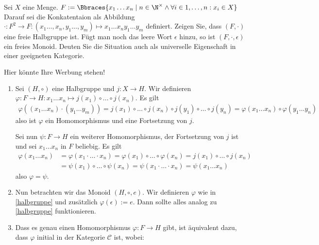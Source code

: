 \begin{exercise}
    Sei $X$ eine Menge. $F := \Bbraces{x_1 \dots x_n \mid n \in \N^\times \land \forall i \in {1, \dots, n}: x_i \in X}$ Darauf sei die Konkatentaion als Abbildung $\cdot: F^2 \to F: (x_1 \dots, x_n, y_1 \dots, y_m) \mapsto x_1 \dots x_n y_1 \dots y_m$ definiert. Zeigen Sie, dass $(F, \cdot)$ eine freie Halbgruppe ist. Fügt man noch das leere Wort $\epsilon$ hinzu, so ist $(F, \cdot, \epsilon)$ ein freies Monoid. Deuten Sie die Situation auch als universelle Eigenschaft in einer geeigneten Kategorie.
\end{exercise}

\begin{solution}
    Hier könnte Ihre Werbung stehen!
    \begin{enumerate}[label = \arabic*)]
        \item \label{halbgruppe} Sei $(H, \circ)$ eine Halbgruppe und $j:X \to H$. Wir definieren $\varphi: F \to H: x_1 \dots x_n \mapsto j(x_1) \circ \dots \circ j(x_n)$. Es gilt
        \begin{align*}
            \varphi((x_1 \dots x_n) \cdot (y_1 \dots y_m)) = j(x_1) \circ \dots \circ j(x_n) \circ j(y_1) \circ \dots \circ j(y_n) = \varphi(x_1 \dots x_n) \circ \varphi(y_1 \dots y_n)
        \end{align*}
        also ist $\varphi$ ein Homomorphismus und eine Fortsetzung von $j$.

        Sei nun $\psi: F \to H$ ein weiterer Homomorphismus, der Fortsetzung von $j$ ist und sei $x_1 \dots x_n$ in $F$ beliebig. Es gilt
        \begin{align*}
            \varphi(x_1 \dots x_n) &= \varphi(x_1 \cdot \dots \cdot x_n) = \varphi(x_1) \circ \dots \circ \varphi(x_n) = j(x_1) \circ \dots \circ j(x_n) \\
            &= \psi(x_1) \circ \dots \circ \psi(x_n) = \psi(x_1 \cdot \dots \cdot x_n) = \psi(x_1 \dots x_n)
        \end{align*}
        also $\varphi = \psi$.
        \item Nun betrachten wir das Monoid $(H, \circ, e)$. Wir definieren $\varphi$ wie in \ref{halbgruppe} und zusätzlich $\varphi(\epsilon) := e$. Dann sollte alles analog zu \ref{halbgruppe} funktionieren.
        \item Dass es genau einen Homomorphismus $\varphi: F \rightarrow H$ gibt, ist äquivalent dazu, dass $\varphi$ initial in der Kategorie $\mathcal{C}$ ist, wobei:


\end{enumerate}
\end{solution}
